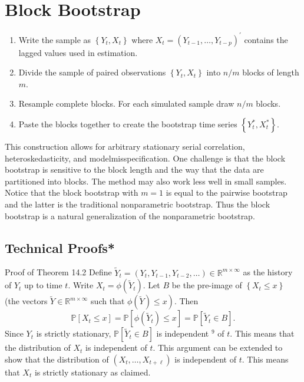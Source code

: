 \documentclass[10pt]{article}
\begin{document}
\section{Block Bootstrap}
\begin{enumerate}
  \item Write the sample as $\left\{Y_{t}, X_{t}\right\}$ where $X_{t}=\left(Y_{t-1}, \ldots, Y_{t-p}\right)^{\prime}$ contains the lagged values used in estimation.

  \item Divide the sample of paired observations $\left\{Y_{t}, X_{t}\right\}$ into $n / m$ blocks of length $m$.

  \item Resample complete blocks. For each simulated sample draw $n / m$ blocks.

  \item Paste the blocks together to create the bootstrap time series $\left\{Y_{t}^{*}, X_{t}^{*}\right\}$.

\end{enumerate}
This construction allows for arbitrary stationary serial correlation, heteroskedasticity, and modelmisspecification. One challenge is that the block bootstrap is sensitive to the block length and the way that the data are partitioned into blocks. The method may also work less well in small samples. Notice that the block bootstrap with $m=1$ is equal to the pairwise bootstrap and the latter is the traditional nonparametric bootstrap. Thus the block bootstrap is a natural generalization of the nonparametric bootstrap.

\subsection{Technical Proofs*}
Proof of Theorem 14.2 Define $\tilde{Y}_{t}=\left(Y_{t}, Y_{t-1}, Y_{t-2}, \ldots\right) \in \mathbb{R}^{m \times \infty}$ as the history of $Y_{t}$ up to time $t$. Write $X_{t}=\phi\left(\widetilde{Y}_{t}\right)$. Let $B$ be the pre-image of $\left\{X_{t} \leq x\right\}$ (the vectors $\widetilde{Y} \in \mathbb{R}^{m \times \infty}$ such that $\left.\phi(\widetilde{Y}) \leq x\right)$. Then
$$
\mathbb{P}\left[X_{t} \leq x\right]=\mathbb{P}\left[\phi\left(\widetilde{Y}_{t}\right) \leq x\right]=\mathbb{P}\left[\tilde{Y}_{t} \in B\right] .
$$
Since $Y_{t}$ is strictly stationary, $\mathbb{P}\left[\tilde{Y}_{t} \in B\right]$ is independent ${ }^{9}$ of $t$. This means that the distribution of $X_{t}$ is independent of $t$. This argument can be extended to show that the distribution of $\left(X_{t}, \ldots, X_{t+\ell}\right)$ is independent of $t$. This means that $X_{t}$ is strictly stationary as claimed.
\end{document}
